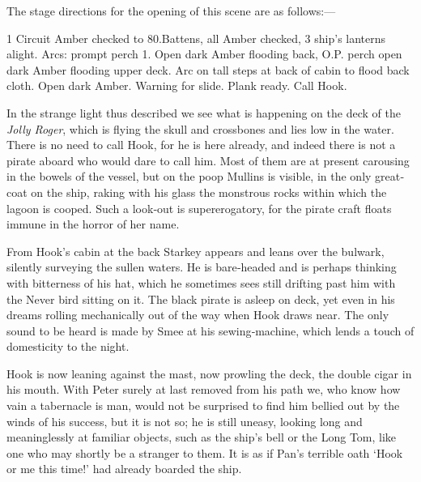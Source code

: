 
\act


\begin{stagedir}
The stage directions for the opening of this scene are as follows:—

1 Circuit Amber checked to 80.\@ Battens, all Amber checked,
3 ship’s lanterns alight.
Arcs: prompt perch 1.
Open dark Amber flooding back, O.P.
perch open dark Amber flooding upper deck.
Arc on tall steps at back of cabin to flood back cloth.
Open dark Amber.
Warning for slide.
Plank ready.
Call Hook.

In the strange light thus described we see what is happening on the deck of the \emph{Jolly Roger},
which is flying the skull and crossbones and lies low in the water.
There is no need to call Hook, for he is here already,
and indeed there is not a pirate aboard who would dare to call him.
Most of them are at present carousing in the bowels of the vessel,
but on the poop Mullins is visible, in the only great‐coat on the ship,
raking with his glass the monstrous rocks within which the lagoon is cooped.
Such a look‐out is supererogatory, for the pirate craft floats immune in the horror of her name.

From Hook’s cabin at the back Starkey appears and leans over the bulwark,
silently surveying the sullen waters.
He is bare‐headed and is perhaps thinking with bitterness of his hat,
which he sometimes sees still drifting past him with the Never bird sitting on it.
The black pirate is asleep on deck,
yet even in his dreams rolling mechanically out of the way when Hook draws near.
The only sound to be heard is made by Smee at his sewing‐machine,
which lends a touch of domesticity to the night.

Hook is now leaning against the mast, now prowling the deck, the double cigar in his mouth.
With Peter surely at last removed from his path we, who know how vain a tabernacle is man,
would not be surprised to find him bellied out by the winds of his success, but it is not so;
he is still uneasy, looking long and meaninglessly at familiar objects, such as the ship’s bell or the Long Tom,
like one who may shortly be a stranger to them.
It is as if Pan’s terrible oath ‘Hook or me this time!’ had already boarded the ship.
\end{stagedir}


